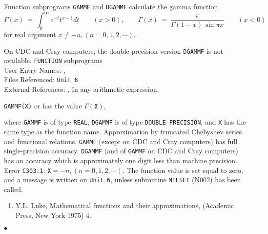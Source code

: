                         
                
\Submitter{}                           
                     \Revised{}
Function subprograms {\tt GAMMF} and {\tt DGAMMF} calculate
the gamma function
$$ \Gamma(x) \ = \ \displaystyle \int_0 ^{\infty} e^{-t} t^{x-1}dt
\qquad (x > 0), \qquad
\Gamma(x) \ = \ \frac{\pi}{\Gamma(1-x)\, \sin \pi x} \qquad (x<0) $$
for real argument $x \neq -n,(n = 0,1,2,\cdots)$.
\par
On CDC and Cray computers,  the double-precision
version {\tt DGAMMF} is not available.
\Structure
{\tt FUNCTION} subprograms\\
User Entry Names: , \\
Files Referenced: {\tt Unit 6} \\
External References: , 
\Usage
In any arithmetic expression,
\begin{center}
{\tt GAMMF(X)} \quad or  \quad has the value \quad
$\Gamma(\mathtt{X})$,
\end{center}
where {\tt GAMMF} is of type {\tt REAL}, {\tt DGAMMF} is of type
{\tt DOUBLE PRECISION}, and  {\tt X}
has the same type as the function name.
\Method
Approximation by truncated Chebyshev series and functional relations.
\Accuracy
{\tt GAMMF} (except on CDC and Cray computers) has full single-precision
accuracy. {\tt DGAMMF} (and of {\tt GAMMF} on CDC and
Cray computers) has an accuracy which is approximately
one digit less than machine precision.
\Errorh
Error {\tt C303.1}: $\mathtt{X} = -n,(n = 0,1,2,\cdots).$
The function value is set equal to zero, and a message is written on
{\tt Unit 6}, unless subroutine {\tt MTLSET} (N002) has been called.
\Refer
\begin{enumerate}
\item Y.L. Luke, Mathematical functions and their approximations,
(Academic Press, New York 1975) 4.
\end{enumerate}
$\bullet$

